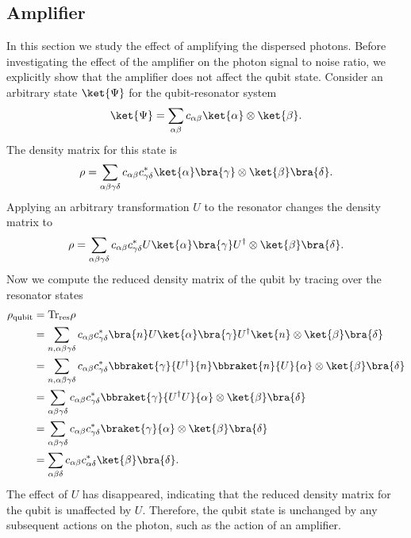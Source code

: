 \subsection{Amplifier}

In this section we study the effect of amplifying the dispersed photons.
Before investigating the effect of the amplifier on the photon signal to noise ratio, we explicitly show that the amplifier does not affect the qubit state.
Consider an arbitrary state $\ket{\Psi}$ for the qubit-resonator system \begin{equation}
\ket{\Psi} = \sum_{\alpha \beta} c_{\alpha \beta} \ket{\alpha} \otimes \ket{\beta} . \end{equation}
The density matrix for this state is \begin{equation}
\rho = \sum_{\alpha \beta \gamma \delta} c_{\alpha \beta}c_{\gamma \delta}^* \ket{\alpha}\bra{\gamma}\otimes \ket{\beta}\bra{\delta} . \end{equation}
Applying an arbitrary transformation $U$ to the resonator changes the density matrix to \begin{equation}
\rho = \sum_{\alpha \beta \gamma \delta} c_{\alpha \beta}c_{\gamma \delta}^* U\ket{\alpha}\bra{\gamma}U^{\dagger} \otimes \ket{\beta}\bra{\delta} . \end{equation}
Now we compute the reduced density matrix of the qubit by tracing over the resonator states \begin{align}
\rho_{\text{qubit}} &= \text{Tr}_{\text{res}} \rho \\
&= \sum_{n, \alpha \beta \gamma \delta} c_{\alpha \beta} c_{\gamma \delta}^* \bra{n}U\ket{\alpha}\bra{\gamma}U^{\dagger}\ket{n} \otimes \ket{\beta}\bra{\delta} \\
&= \sum_{n, \alpha \beta \gamma \delta} c_{\alpha \beta} c_{\gamma \delta}^* \bbraket{\gamma}{U^{\dagger}}{n} \bbraket{n}{U}{\alpha} \otimes \ket{\beta}\bra{\delta} \\
&= \sum_{\alpha \beta \gamma \delta} c_{\alpha \beta} c_{\gamma \delta}^* \bbraket{\gamma}{U^{\dagger}U}{\alpha} \otimes \ket{\beta}\bra{\delta} \\
&= \sum_{\alpha \beta \gamma \delta} c_{\alpha \beta} c_{\gamma \delta}^* \braket{\gamma}{\alpha} \otimes \ket{\beta}\bra{\delta} \\
&= \sum_{\alpha \beta \delta} c_{\alpha \beta} c_{\alpha \delta}^* \ket{\beta}\bra{\delta} .
\end{align}
The effect of $U$ has disappeared, indicating that the reduced density matrix for the qubit is unaffected by $U$.
Therefore, the qubit state is unchanged by any subsequent actions on the photon, such as the action of an amplifier.

